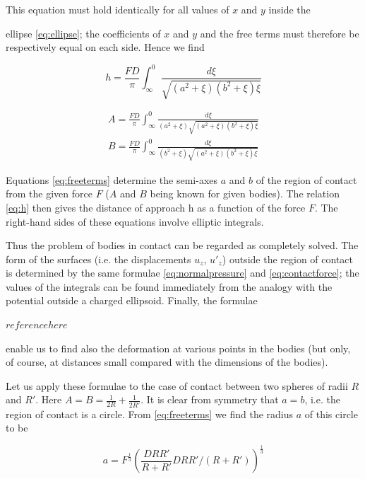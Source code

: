 This equation must hold identically for all values of $x$ and $y$ inside the

ellipse \ref{eq:ellipse}; the coefficients of $x$ and $y$ and the free terms must therefore be respectively equal on each side. Hence we find

\begin{equation}
h = \frac{FD}{\pi} \int_{\infty}^{0} \frac{d\xi}{\sqrt{(a^{2} + \xi)(b^{2} + \xi)\xi}}
\label{eq:h}
\end{equation}

\begin{equation}
\begin{split}
A = \frac{FD}{\pi} \int_{\infty}^{0} \frac{d\xi}{(a^{2}+\xi)\sqrt{(a^{2} + \xi)(b^{2} + \xi)\xi}} \\
B = \frac{FD}{\pi} \int_{\infty}^{0} \frac{d\xi}{(b^{2}+\xi)\sqrt{(a^{2} + \xi)(b^{2} + \xi)\xi}}
\end{split}
\label{eq:freeterms}
\end{equation}

Equations \ref{eq:freeterms} determine the semi-axes $a$ and $b$ of the region of contact from the given force $F$ ($A$ and $B$ being known for given bodies). The relation \ref{eq:h} then gives the distance of approach h as a function of the force $F$. The right-hand sides of these equations involve elliptic integrals.



Thus the problem of bodies in contact can be regarded as completely
solved. The form of the surfaces (i.e. the displacements $u_{z}$, $u'_{z}$) outside the region of contact is determined by the same formulae \ref{eq:normalpressure} and \ref{eq:contactforce}; the values of the integrals can be found immediately from the analogy with the potential outside a charged ellipsoid. Finally, the formulae \citep{duran}

$reference here$

 enable us to find also the deformation at various points in the bodies (but only, of course, at distances small compared with the dimensions of the bodies).

Let us apply these formulae to the case of contact between two spheres of
radii $R$ and $R'$. Here $A = B = \frac{1}{2R} + \frac{1}{2R'}$. It is clear from symmetry that $a = b$, i.e. the region of contact is a circle. From \ref{eq:freeterms} we find the radius $a$ of this circle to be

\begin{equation}
a = F^{\frac{1}{3}} (\frac{DRR'}{R+R'} DRR'/(R+R'))^{\frac{1}{3}}
\end{equation}

